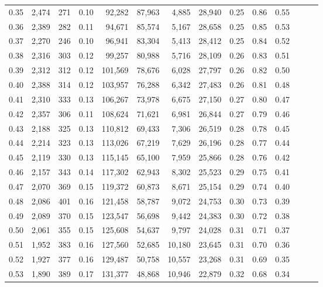 \begin{tabular}{rrrrrrrrrrrrrr}
0.35 &  2,474 &  271 &  0.10 &   92,282 &   87,963 &   4,885 &  28,940 &  0.25 &  0.86 &      0.55 \\
0.36 &  2,389 &  282 &  0.11 &   94,671 &   85,574 &   5,167 &  28,658 &  0.25 &  0.85 &      0.53 \\
0.37 &  2,270 &  246 &  0.10 &   96,941 &   83,304 &   5,413 &  28,412 &  0.25 &  0.84 &      0.52 \\
0.38 &  2,316 &  303 &  0.12 &   99,257 &   80,988 &   5,716 &  28,109 &  0.26 &  0.83 &      0.51 \\
0.39 &  2,312 &  312 &  0.12 &  101,569 &   78,676 &   6,028 &  27,797 &  0.26 &  0.82 &      0.50 \\
0.40 &  2,388 &  314 &  0.12 &  103,957 &   76,288 &   6,342 &  27,483 &  0.26 &  0.81 &      0.48 \\
0.41 &  2,310 &  333 &  0.13 &  106,267 &   73,978 &   6,675 &  27,150 &  0.27 &  0.80 &      0.47 \\
0.42 &  2,357 &  306 &  0.11 &  108,624 &   71,621 &   6,981 &  26,844 &  0.27 &  0.79 &      0.46 \\
0.43 &  2,188 &  325 &  0.13 &  110,812 &   69,433 &   7,306 &  26,519 &  0.28 &  0.78 &      0.45 \\
0.44 &  2,214 &  323 &  0.13 &  113,026 &   67,219 &   7,629 &  26,196 &  0.28 &  0.77 &      0.44 \\
0.45 &  2,119 &  330 &  0.13 &  115,145 &   65,100 &   7,959 &  25,866 &  0.28 &  0.76 &      0.42 \\
0.46 &  2,157 &  343 &  0.14 &  117,302 &   62,943 &   8,302 &  25,523 &  0.29 &  0.75 &      0.41 \\
0.47 &  2,070 &  369 &  0.15 &  119,372 &   60,873 &   8,671 &  25,154 &  0.29 &  0.74 &      0.40 \\
0.48 &  2,086 &  401 &  0.16 &  121,458 &   58,787 &   9,072 &  24,753 &  0.30 &  0.73 &      0.39 \\
0.49 &  2,089 &  370 &  0.15 &  123,547 &   56,698 &   9,442 &  24,383 &  0.30 &  0.72 &      0.38 \\
0.50 &  2,061 &  355 &  0.15 &  125,608 &   54,637 &   9,797 &  24,028 &  0.31 &  0.71 &      0.37 \\
0.51 &  1,952 &  383 &  0.16 &  127,560 &   52,685 &  10,180 &  23,645 &  0.31 &  0.70 &      0.36 \\
0.52 &  1,927 &  377 &  0.16 &  129,487 &   50,758 &  10,557 &  23,268 &  0.31 &  0.69 &      0.35 \\
0.53 &  1,890 &  389 &  0.17 &  131,377 &   48,868 &  10,946 &  22,879 &  0.32 &  0.68 &      0.34 \\

\end{tabular}
